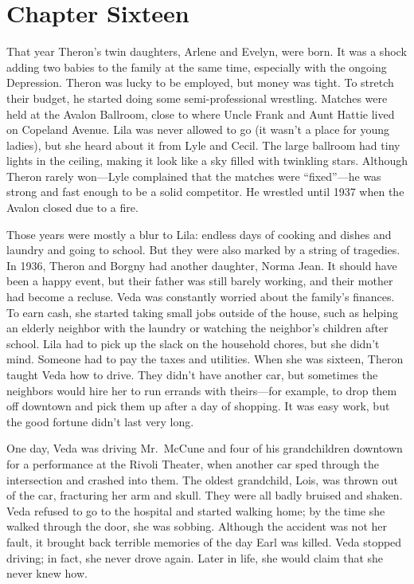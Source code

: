 \documentclass[
  letterpaper,
]{book}
\begin{document}

\chapter{Chapter Sixteen}\label{chapter-sixteen}

That year Theron's twin daughters, Arlene and Evelyn, were born. It was
a shock adding two babies to the family at the same time, especially
with the ongoing Depression. Theron was lucky to be employed, but money
was tight. To stretch their budget, he started doing some
semi-professional wrestling. Matches were held at the Avalon Ballroom,
close to where Uncle Frank and Aunt Hattie lived on Copeland Avenue.
Lila was never allowed to go (it wasn't a place for young ladies), but
she heard about it from Lyle and Cecil. The large ballroom had tiny
lights in the ceiling, making it look like a sky filled with twinkling
stars. Although Theron rarely won---Lyle complained that the matches
were ``fixed''---he was strong and fast enough to be a solid competitor.
He wrestled until 1937 when the Avalon closed due to a fire.

Those years were mostly a blur to Lila: endless days of cooking and
dishes and laundry and going to school. But they were also marked by a
string of tragedies. In 1936, Theron and Borgny had another daughter,
Norma Jean. It should have been a happy event, but their father was
still barely working, and their mother had become a recluse. Veda was
constantly worried about the family's finances. To earn cash, she
started taking small jobs outside of the house, such as helping an
elderly neighbor with the laundry or watching the neighbor's children
after school. Lila had to pick up the slack on the household chores, but
she didn't mind. Someone had to pay the taxes and utilities. When she
was sixteen, Theron taught Veda how to drive. They didn't have another
car, but sometimes the neighbors would hire her to run errands with
theirs---for example, to drop them off downtown and pick them up after a
day of shopping. It was easy work, but the good fortune didn't last very
long.

One day, Veda was driving Mr.~McCune and four of his grandchildren
downtown for a performance at the Rivoli Theater, when another car sped
through the intersection and crashed into them. The oldest grandchild,
Lois, was thrown out of the car, fracturing her arm and skull. They were
all badly bruised and shaken. Veda refused to go to the hospital and
started walking home; by the time she walked through the door, she was
sobbing. Although the accident was not her fault, it brought back
terrible memories of the day Earl was killed. Veda stopped driving; in
fact, she never drove again. Later in life, she would claim that she
never knew how.
\end{document}
